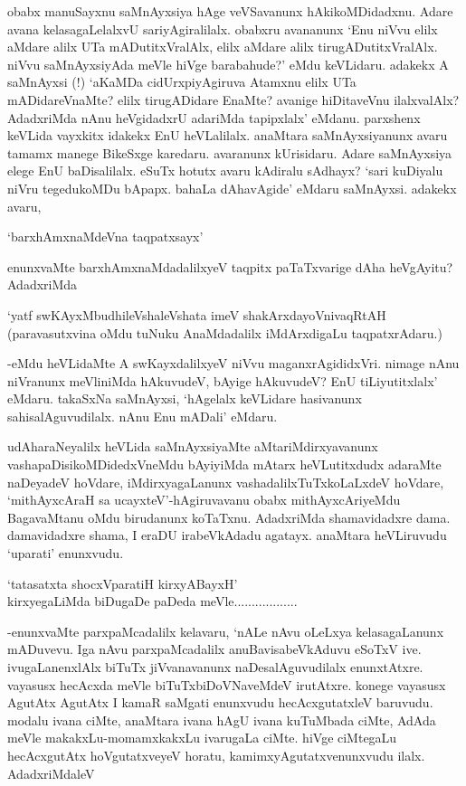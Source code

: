 obabx manuSayxnu saMnAyxsiya hAge veVSavanunx hAkikoMDidadxnu. Adare avana kelasagaLelalxvU sariyAgiralilalx. obabxru avananunx `Enu niVvu elilx aMdare alilx UTa mADutitxVralAlx, elilx aMdare alilx tirugADutitxVralAlx. niVvu saMnAyxsiyAda meVle hiVge barabahude?' eMdu keVLidaru. adakekx A saMnAyxsi (!) `aKaMDa cidUrxpiyAgiruva Atamxnu elilx UTa mADidareVnaMte? elilx tirugADidare EnaMte? avanige hiDitaveVnu ilalxvalAlx? AdadxriMda nAnu heVgidadxrU adariMda tapipxlalx' eMdanu. parxshenx keVLida vayxkitx idakekx EnU heVLalilalx. anaMtara saMnAyxsiyanunx avaru tamamx manege BikeSxge karedaru. avaranunx kUrisidaru. Adare saMnAyxsiya elege EnU baDisalilalx. eSuTx hotutx avaru kAdiralu sAdhayx? `sari kuDiyalu niVru tegedukoMDu bApapx. bahaLa dAhavAgide' eMdaru saMnAyxsi. adakekx avaru,

\begin{shloka}
`barxhAmxnaMdeVna taqpatxsayx'
\end{shloka}

enunxvaMte barxhAmxnaMdadalilxyeV taqpitx paTaTxvarige dAha heVgAyitu? AdadxriMda

\begin{shloka}
`yatf swKAyxMbudhileVshaleVshata imeV shakArxdayoVnivaqRtAH\\
(paravasutxvina oMdu tuNuku AnaMdadalilx iMdArxdigaLu taqpatxrAdaru.)
\end{shloka}

-eMdu heVLidaMte A swKayxdalilxyeV niVvu maganxrAgididxVri. nimage nAnu niVranunx meVliniMda hAkuvudeV, bAyige hAkuvudeV? EnU tiLiyutitxlalx' eMdaru. takaSxNa saMnAyxsi, `hAgelalx keVLidare hasivanunx sahisalAguvudilalx. nAnu Enu mADali' eMdaru.

udAharaNeyalilx heVLida saMnAyxsiyaMte aMtariMdirxyavanunx vashapaDisikoMDidedxVneMdu bAyiyiMda mAtarx heVLutitxdudx adaraMte naDeyadeV hoVdare, iMdirxyagaLanunx vashadalilxTuTxkoLaLxdeV hoVdare, `mithAyxcAraH sa ucayxteV'-hAgiruvavanu obabx mithAyxcAriyeMdu BagavaMtanu oMdu birudanunx koTaTxnu. AdadxriMda shamavidadxre dama. damavidadxre shama, I eraDU irabeVkAdadu agatayx. anaMtara heVLiruvudu `uparati' enunxvudu.

\begin{shloka}
`tatasatxta shocxVparatiH kirxyABayxH'\\
kirxyegaLiMda biDugaDe paDeda meVle..................
\end{shloka}

-enunxvaMte parxpaMcadalilx kelavaru, `nALe nAvu oLeLxya kelasagaLanunx mADuvevu. Iga nAvu parxpaMcadalilx anuBavisabeVkAduvu eSoTxV ive. ivugaLanenxlAlx biTuTx jiVvanavanunx naDesalAguvudilalx enunxtAtxre. vayasusx hecAcxda meVle biTuTxbiDoVNaveMdeV irutAtxre. konege vayasusx AgutAtx AgutAtx I kamaR saMgati enunxvudu hecAcxgutatxleV baruvudu. modalu ivana ciMte, anaMtara ivana hAgU ivana kuTuMbada ciMte, AdAda meVle makakxLu-momamxkakxLu ivarugaLa ciMte. hiVge ciMtegaLu hecAcxgutAtx hoVgutatxveyeV horatu, kamimxyAgutatxvenunxvudu ilalx. AdadxriMdaleV

